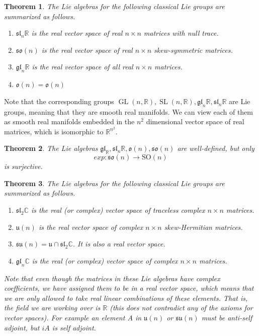 \documentclass{article}
\DeclareMathOperator{\GL}{GL}
\DeclareMathOperator{\SL}{SL}
\newtheorem{theorem}{Theorem}[section]
\theoremstyle{remark}
\theoremstyle{definition}
\begin{document}
\begin{theorem}
The Lie algebras for the following classical Lie groups are summarized as follows. 
\begin{enumerate}
    \item $\mathfrak{sl}_n \mathbb{R}$ is the real vector space of real $n \times n$ matrices with null trace.
    \item $\mathfrak{so}(n)$ is the real vector space of real $n \times n$ skew-symmetric matrices. 
    \item $\mathfrak{gl}_n \mathbb{R}$ is the real vector space of all real $n \times n$ matrices.
    \item $\mathfrak{o}(n) = \mathfrak{o}(n)$
\end{enumerate}
\end{theorem}
Note that the corresponding groups $\GL(n, \mathbb{R}), \SL(n, \mathbb{R}), \mathfrak{gl}_n \mathbb{R}, \mathfrak{sl}_n \mathbb{R}$ are Lie groups, meaning that they are smooth real manifolds. We can view each of them as smooth real manifolds embedded in the $n^2$ dimensional vector space of real matrices, which is isomorphic to $\mathbb{R}^{n^2}$. 

\begin{theorem}
The Lie algebras $\mathfrak{gl}_ \mathbb{R}, \mathfrak{sl}_n \mathbb{R}, \mathfrak{o}(n), \mathfrak{so}(n)$ are well-defined, but only 
\[exp: \mathfrak{so}(n) \longrightarrow \text{SO}(n)\]
is surjective. 
\end{theorem}

\begin{theorem}
The Lie algebras for the following classical Lie groups are summarized as follows. 
\begin{enumerate}
    \item $\mathfrak{sl}_2 \mathbb{C}$ is the real (or complex) vector space of traceless complex $n \times n$ matrices. 
    \item $\mathfrak{u}(n)$ is the real vector space of complex $n \times n$ skew-Hermitian matrices. 
    \item $\mathfrak{su}(n) = \mathfrak{u} \cap \mathfrak{sl}_2 \mathbb{C}$. It is also a real vector space. 
    \item $\mathfrak{gl}_n \mathbb{C}$ is the real (or complex) vector space of complex $n \times n$ matrices. 
\end{enumerate}
Note that even though the matrices in these Lie algebras have complex coefficients, we have assigned them to be in a \textit{real} vector space, which means that we are only allowed to take real linear combinations of these elements. That is, the field we are working over is $\mathbb{R}$ (this does not contradict any of the axioms for vector spaces). For example an element $A$ in $\mathfrak{u}(n)$ or $\mathfrak{su}(n)$ must be anti-self adjoint, but $iA$ is self adjoint. 
\end{theorem}
\end{document}
